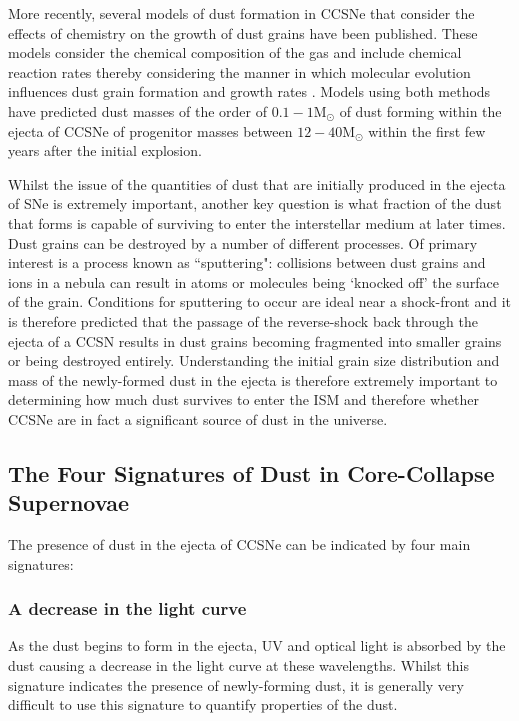 More recently, several models of dust formation in CCSNe that consider the effects of chemistry on the growth of dust grains have been published.   These models consider the chemical composition of the gas and include chemical reaction rates thereby considering the manner in which molecular evolution influences dust grain formation and growth rates \citep{Cherchneff2009, Cherchneff2010, Sarangi2013, Sarangi2015}.  Models using both methods have predicted dust masses of the order of $0.1-1$M$_{\odot}$ of dust forming within the ejecta of CCSNe of progenitor masses between $12-40$M$_{\odot}$ within the first few years after the initial explosion.  

Whilst the issue of the quantities of dust that are initially produced in the ejecta of SNe is extremely important, another key question is what fraction of the dust that forms is capable of surviving to enter the interstellar medium at later times. Dust grains can be destroyed by a number of different processes.  Of primary interest is a process known as ``sputtering": collisions between dust grains and ions in a nebula can result in atoms or molecules being `knocked off' the surface of the grain.  Conditions for sputtering to occur are ideal near a shock-front \citep{Barlow1977} and it is therefore predicted that the passage of the reverse-shock back through the ejecta of a CCSN results in dust grains becoming fragmented into smaller grains or being destroyed entirely.  Understanding the initial grain size distribution and mass of the newly-formed dust in the ejecta is therefore extremely important to determining how much dust survives to enter the ISM and therefore whether CCSNe are in fact a significant source of dust in the universe.


\subsection{The Four Signatures of Dust in Core-Collapse Supernovae}
\label{three_sigs}


The presence of dust in the ejecta of CCSNe can be indicated by four main signatures: 

\subsubsection{A decrease in the light curve} 
As the dust begins to form in the ejecta, UV and optical light is absorbed by the dust causing a decrease in the light curve at these wavelengths.  Whilst this signature indicates the presence of newly-forming dust, it is generally very difficult to use this signature to quantify properties of the dust.

